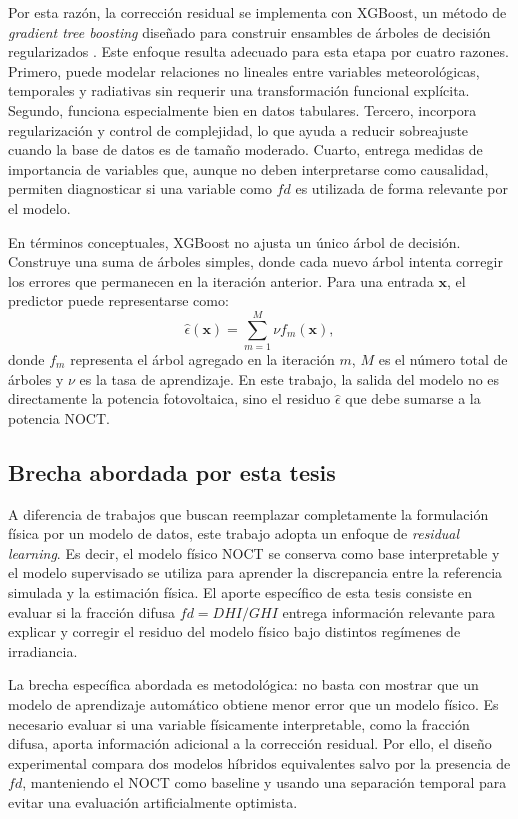 \documentclass[12pt, letterpaper]{article}
\begin{document}
Por esta raz\'on, la correcci\'on residual se implementa con XGBoost, un m\'etodo de \textit{gradient tree boosting} dise\~nado para construir ensambles de \'arboles de decisi\'on regularizados \cite{xgboost2016}. Este enfoque resulta adecuado para esta etapa por cuatro razones. Primero, puede modelar relaciones no lineales entre variables meteorol\'ogicas, temporales y radiativas sin requerir una transformaci\'on funcional expl\'icita. Segundo, funciona especialmente bien en datos tabulares. Tercero, incorpora regularizaci\'on y control de complejidad, lo que ayuda a reducir sobreajuste cuando la base de datos es de tama\~no moderado. Cuarto, entrega medidas de importancia de variables que, aunque no deben interpretarse como causalidad, permiten diagnosticar si una variable como \(fd\) es utilizada de forma relevante por el modelo.

En t\'erminos conceptuales, XGBoost no ajusta un \'unico \'arbol de decisi\'on. Construye una suma de \'arboles simples, donde cada nuevo \'arbol intenta corregir los errores que permanecen en la iteraci\'on anterior. Para una entrada \(\mathbf{x}\), el predictor puede representarse como:
\[
    \widehat{\epsilon}(\mathbf{x}) =
    \sum_{m=1}^{M} \nu f_m(\mathbf{x}),
\]
donde \(f_m\) representa el \'arbol agregado en la iteraci\'on \(m\), \(M\) es el n\'umero total de \'arboles y \(\nu\) es la tasa de aprendizaje. En este trabajo, la salida del modelo no es directamente la potencia fotovoltaica, sino el residuo \(\widehat{\epsilon}\) que debe sumarse a la potencia NOCT.

\subsection{Brecha abordada por esta tesis}

A diferencia de trabajos que buscan reemplazar completamente la formulaci\'on f\'isica por un modelo de datos, este trabajo adopta un enfoque de \textit{residual learning}. Es decir, el modelo f\'isico NOCT se conserva como base interpretable y el modelo supervisado se utiliza para aprender la discrepancia entre la referencia simulada y la estimaci\'on f\'isica. El aporte espec\'ifico de esta tesis consiste en evaluar si la fracci\'on difusa \(fd = DHI/GHI\) entrega informaci\'on relevante para explicar y corregir el residuo del modelo f\'isico bajo distintos reg\'imenes de irradiancia.

La brecha espec\'ifica abordada es metodol\'ogica: no basta con mostrar que un modelo de aprendizaje autom\'atico obtiene menor error que un modelo f\'isico. Es necesario evaluar si una variable f\'isicamente interpretable, como la fracci\'on difusa, aporta informaci\'on adicional a la correcci\'on residual. Por ello, el dise\~no experimental compara dos modelos h\'ibridos equivalentes salvo por la presencia de \(fd\), manteniendo el NOCT como baseline y usando una separaci\'on temporal para evitar una evaluaci\'on artificialmente optimista.
\end{document}

